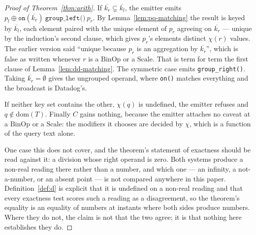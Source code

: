 \begin{proof}[Proof of Theorem~\ref{thm:arith}]
If $\overline{k_r}\subsetneq\overline{k_l}$, the emitter emits
$p_l \oplus \texttt{on}(\overline{k_r})\ \texttt{group\_left()}\ p_r$. By
Lemma~\ref{lem:pq-matching} the result is keyed by $\overline{k_l}$, each element paired
with the unique element of $p_r$ agreeing on $\overline{k_r}$ --- unique by the
induction's second clause, which gives $p_r$'s elements distinct $\chi(r)$ values. The
earlier version said ``unique because $p_r$ is an aggregation by $\overline{k_r}$'',
which is false as written whenever $r$ is a $\mathrm{BinOp}$ or a $\mathrm{Scale}$. That is term for term the first clause of Lemma~\ref{lem:dd-matching}. The
symmetric case emits \texttt{group\_right()}. Taking $\overline{k_r}=\emptyset$ gives the
ungrouped operand, where \texttt{on()} matches everything and the broadcast is Datadog's.

If neither key set contains the other, $\chi(q)$ is undefined, the emitter refuses and
$q\notin\mathrm{dom}(T)$. Finally $C$ gains nothing, because the emitter attaches no
caveat at a $\mathrm{BinOp}$ or a $\mathrm{Scale}$: the modifiers it chooses are decided
by $\chi$, which is a function of the query text alone.

One case this does not cover, and the theorem's statement of exactness should be read
against it: a division whose right operand is zero. Both systems produce a
non-real reading there rather than a number, and which one --- an infinity, a
not-a-number, or an absent point --- is not compared anywhere in this paper.
Definition~\ref{def:d} is explicit that it is undefined on a non-real reading and that
every exactness test scores such a reading as a disagreement, so the theorem's equality
is an equality of numbers at instants where both sides produce numbers. Where they do
not, the claim is not that the two agree; it is that nothing here establishes they do.
\end{proof}
